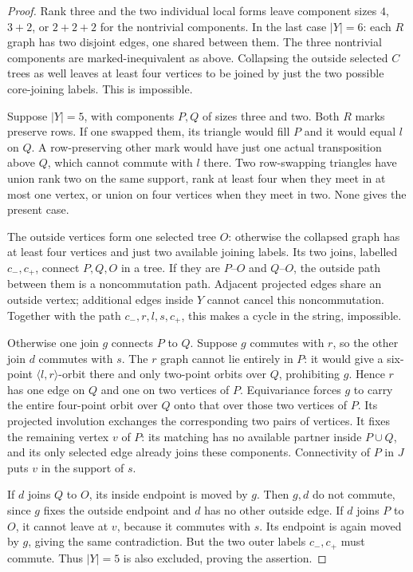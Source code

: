 \documentclass[11pt,a4paper]{article}
\newcommand{\gen}[1]{\langle#1\rangle}
\begin{document}
\begin{proof}
Rank three and the two individual local forms leave component
sizes $4$, $3+2$, or $2+2+2$ for the nontrivial components.
In the last case $|Y|=6$: each $R$ graph has two disjoint
edges, one shared between them. The three nontrivial components
are marked-inequivalent as above. Collapsing the outside selected
$C$ trees as well leaves at least four vertices to be joined
by just the two possible core-joining labels. This is impossible.

Suppose $|Y|=5$, with components $P,Q$ of sizes three and two.
Both $R$ marks preserve rows. If one swapped them, its triangle
would fill $P$ and it would equal $l$ on $Q$. A row-preserving
other mark would have just one actual transposition above $Q$,
which cannot commute with $l$ there. Two row-swapping triangles
have union rank two on the same support, rank at least four when
they meet in at most one vertex, or union on four vertices when
they meet in two. None gives the present case.

The outside vertices form one selected tree $O$: otherwise the
collapsed graph has at least four vertices and just two available
joining labels. Its two joins, labelled $c_-,c_+$, connect
$P,Q,O$ in a tree. If they are $P$--$O$ and $Q$--$O$, the
outside path between them is a noncommutation path. Adjacent
projected edges share an outside vertex; additional edges inside
$Y$ cannot cancel this noncommutation. Together with the path
$c_-,r,l,s,c_+$, this makes a cycle in the string, impossible.

Otherwise one join $g$ connects $P$ to $Q$. Suppose $g$ commutes
with $r$, so the other join $d$ commutes with $s$. The $r$ graph
cannot lie entirely in $P$: it would give a six-point
$\gen{l,r}$-orbit there and only two-point orbits over $Q$,
prohibiting $g$. Hence $r$ has one edge on $Q$ and one on two
vertices of $P$. Equivariance forces $g$ to carry the entire
four-point orbit over $Q$ onto that over those two vertices of
$P$. Its projected involution exchanges the corresponding two
pairs of vertices. It fixes the remaining vertex $v$ of $P$:
its matching has no available partner inside $P\cup Q$, and
its only selected edge already joins these components. Connectivity
of $P$ in $J$ puts $v$ in the support of $s$.

If $d$ joins $Q$ to $O$, its inside endpoint is moved by $g$.
Then $g,d$ do not commute, since $g$ fixes the outside endpoint
and $d$ has no other outside edge. If $d$ joins $P$ to $O$,
it cannot leave at $v$, because it commutes with $s$. Its endpoint
is again moved by $g$, giving the same contradiction. But the
two outer labels $c_-,c_+$ must commute. Thus $|Y|=5$ is
also excluded, proving the assertion.
\end{proof}
\end{document}
